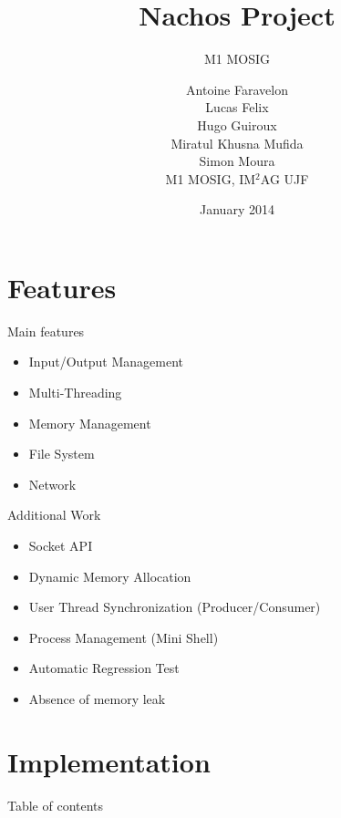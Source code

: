 \documentclass{beamer}
\title{Nachos Project}
\subtitle{M1 MOSIG}
\author{Antoine Faravelon
\\
Lucas Felix
\\
Hugo Guiroux
\\
Miratul Khusna Mufida
\\
Simon Moura
\\
M1 MOSIG, IM$^2$AG UJF 
}
\date{January 2014}
\begin{document}
\frame{\titlepage} 

\begin{frame}
    \tableofcontents
\end{frame}

\section{Features}

\begin{frame}{Main features}
    \begin{itemize}
        \item Input/Output Management
        \item Multi-Threading
        \item Memory Management
        \item File System
        \item Network
    \end{itemize}
\end{frame}

\begin{frame}{Additional Work}
    \begin{itemize}
        \item Socket API 
        \item Dynamic Memory Allocation
        \item User Thread Synchronization (Producer/Consumer)
        \item Process Management (Mini Shell)
        \item Automatic Regression Test 
        \item Absence of memory leak
    \end{itemize}
\end{frame}

\section{Implementation}
\begin{frame}{Table of contents}
    \tableofcontents[currentsection]
\end{frame}
\end{document}
